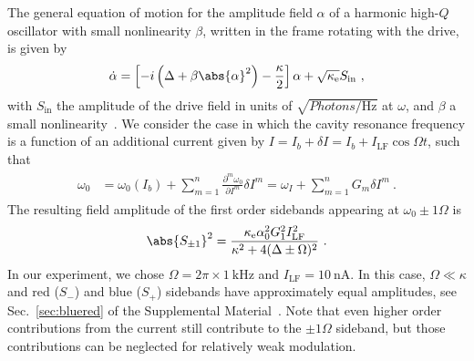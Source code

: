 The general equation of motion for the amplitude field $\alpha$ of a harmonic high-$Q$ oscillator with small nonlinearity $\beta$, written in the frame rotating with the drive, is given by
% 
\begin{align}
\dot{\alpha} = \left[ -i \left( \Delta+\beta\abs{\alpha}^2 \right)-\frac{\kappa}{2} \right]\alpha + \sqrt{\kappa_\text{e}} S_\text{in}\ ,
\label{eq:Duffing-EOM}
\end{align}
% 
with $S_\text{in}$ the amplitude of the drive field in units of $\sqrt{\si{Photons\per\hertz}}$ at $\omega$, and $\beta$ a small nonlinearity~\cite{castellanos-beltranDevelopmentJosephsonParametric2010}.
% 
We consider the case in which the cavity resonance frequency is a function of an additional current given by $I = I_b + \delta I=I_b+I_\text{LF}\cos\Omega t$, such that
% 
\begin{align}
\begin{split}
\omega_0 &= \omega_0(I_b) + \sum_{m=1}^n \frac{\partial^m \omega_0}{\partial I^m}\delta I^m = \omega_I + \sum_{m=1}^n G_m \delta I^m \ .
\label{eq:omega_Taylor}
\end{split}
\end{align}
% 
The resulting field amplitude of the first order sidebands appearing at $\omega_0\pm1\Omega$ is
% 
\begin{align}
\abs{S_{\pm 1}}^2 = \frac{\kappa_\text{e}\alpha_0^2 G_1^2 I_\text{LF}^2}{\kappa^2+4(\Delta\pm\Omega)^2}\ .
\label{eq:first_amplitude}
\end{align}
% 
In our experiment, we chose $\Omega=2\pi\times\SI{1}{\kilo\hertz}$ and $I_\text{LF}=\SI{10}{\nano\ampere}$.
% 
In this case, $\Omega\ll\kappa$ and red ($S_{-}$) and blue ($S_{+}$) sidebands have approximately equal amplitudes, see Sec.~\ref{sec:bluered} of the Supplemental Material~\cite{SeeSupplementalMaterial}.
% 
Note that even higher order contributions from the current still contribute to the $\pm1\Omega$ sideband, but those contributions can be neglected for relatively weak modulation.

